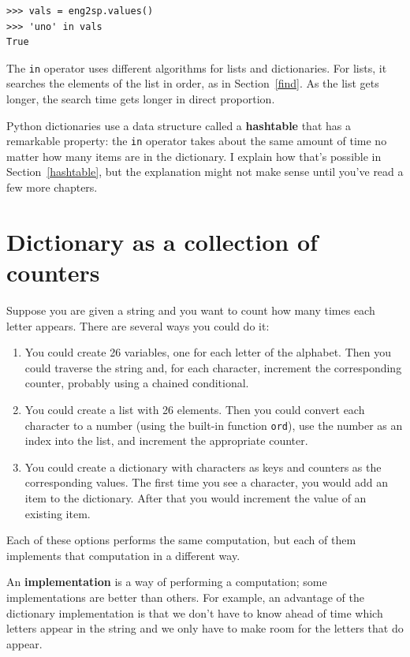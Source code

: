 \documentclass[10pt]{book}
\begin{document}
\begin{verbatim}
>>> vals = eng2sp.values()
>>> 'uno' in vals
True
\end{verbatim}
%
The {\tt in} operator uses different algorithms for lists and
dictionaries.  For lists, it searches the elements of the list in
order, as in Section~\ref{find}.  As the list gets longer, the search
time gets longer in direct proportion.

Python dictionaries use a data structure
called a {\bf hashtable} that has a remarkable property: the
{\tt in} operator takes about the same amount of time no matter how
many items are in the dictionary.  I explain how that's possible
in Section~\ref{hashtable}, but the explanation might not make
sense until you've read a few more chapters.


\section{Dictionary as a collection of counters}
\label{histogram}

Suppose you are given a string and you want to count how many
times each letter appears.  There are several ways you could do it:

\begin{enumerate}

\item You could create 26 variables, one for each letter of the
alphabet.  Then you could traverse the string and, for each
character, increment the corresponding counter, probably using
a chained conditional.

\item You could create a list with 26 elements.  Then you could
convert each character to a number (using the built-in function
{\tt ord}), use the number as an index into the list, and increment
the appropriate counter.

\item You could create a dictionary with characters as keys
and counters as the corresponding values.  The first time you
see a character, you would add an item to the dictionary.  After
that you would increment the value of an existing item.

\end{enumerate}

Each of these options performs the same computation, but each
of them implements that computation in a different way.

An {\bf implementation} is a way of performing a computation;
some implementations are better than others.  For example,
an advantage of the dictionary implementation is that we don't
have to know ahead of time which letters appear in the string
and we only have to make room for the letters that do appear.
\end{document}
